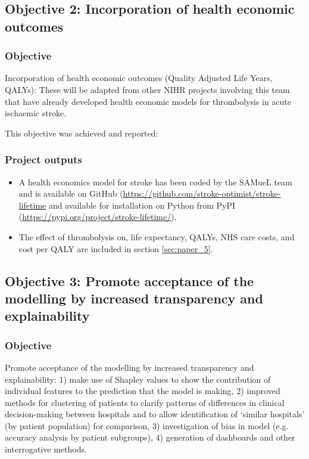 
\subsection{Objective 2: Incorporation of health economic outcomes}

\subsubsection{Objective}

Incorporation of health economic outcomes (Quality Adjusted Life Years, QALYs): These will be adapted from other NIHR projects involving this team that have already developed health economic models for thrombolysis in acute ischaemic stroke.

This objective was achieved and reported:

\subsubsection{Project outputs}

\begin{itemize}
    \item A health economics model for stroke has been coded by the SAMueL team and is available on GitHub (\url{https://github.com/stroke-optimist/stroke-lifetime} and available for installation on Python from PyPI (\url{https://pypi.org/project/stroke-lifetime/}).
    \item The effect of thrombolysis on, life expectancy, QALYs, NHS care costs, and cost per QALY are included in section \ref{sec:paper_5}.
\end{itemize}


\subsection{Objective 3: Promote acceptance of the modelling by increased transparency and explainability}

\subsubsection{Objective}

Promote acceptance of the modelling by increased transparency and explainability: 1) make use of Shapley values to show the contribution of individual features to the prediction that the model is making, 2) improved methods for clustering of patients to clarify patterns of differences in clinical decision-making between hospitals and to allow identification of ‘similar hospitals’ (by patient population) for comparison, 3) investigation of bias in model (e.g. accuracy analysis by patient subgroups), 4) generation of dashboards and other interrogative methods.


